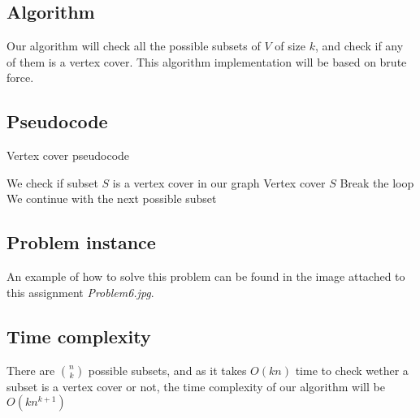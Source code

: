 \documentclass{article}
\begin{document}
\subsection*{Algorithm}

Our algorithm will check all the possible subsets of $V$ of size $k$, and check if any of them is a vertex cover. This algorithm implementation will be based on brute force.

\subsection*{Pseudocode}

\begin{algorithm}[H]
\caption{Vertex cover pseudocode}
\begin{algorithmic}[1]
 \State We check if subset $S$ is a vertex cover in our graph
  \State \Return Vertex cover $S$
  \State Break the loop
  \State We continue with the next possible subset
 \EndIf
\EndWhile
\end{algorithmic}
\end{algorithm}

\subsection*{Problem instance}

An example of how to solve this problem can be found in the image attached to this assignment \textit{Problem6.jpg}.

\subsection*{Time complexity}

There are $\binom{n}{k}$ possible subsets, and as it takes $O(kn)$ time to check wether a subset is a vertex cover or not, the time complexity of our algorithm will be $O(kn^{k+1})$
\end{document}

